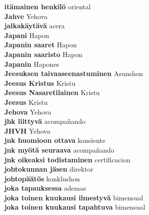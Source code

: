 \textbf{ itämainen henkilö  } oriental \\
\textbf{ Jahve  } Yehova \\
\textbf{ jalkakäytävä  } acera \\
\textbf{ Japani  } Hapon \\
\textbf{ Japanin saaret  } Hapon \\
\textbf{ Japanin saaristo  } Hapon \\
\textbf{ Japanin  } Hapones \\
\textbf{ Jeesuksen taivaaseenastuminen  } Asunshon \\
\textbf{ Jeesus Kristus  } Kristu \\
\textbf{ Jeesus Nasaretilainen  } Kristu \\
\textbf{ Jeesus  } Kristu \\
\textbf{ Jehova  } Yehova \\
\textbf{ jhk liittyvä  } acompañando \\
\textbf{ JHVH  } Yehova \\
\textbf{ jnk huomioon ottava  } konsiente \\
\textbf{ jnk myötä seuraava  } acompañando \\
\textbf{ jnk oikeaksi todistaminen  } certificacion \\
\textbf{ johtokunnan jäsen  } direktor \\
\textbf{ johtopäätös  } konklushon \\
\textbf{ joka tapauksessa  } ademas \\
\textbf{ joka toinen kuukausi ilmestyvä  } bimensual \\
\textbf{ joka toinen kuukausi tapahtuva  } bimensual \\
